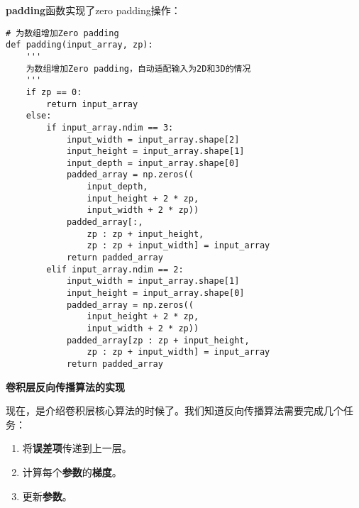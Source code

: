 \textbf{padding}函数实现了zero padding操作：
\begin{lstlisting}
# 为数组增加Zero padding
def padding(input_array, zp):
    '''
    为数组增加Zero padding，自动适配输入为2D和3D的情况
    '''
    if zp == 0:
        return input_array
    else:
        if input_array.ndim == 3:
            input_width = input_array.shape[2]
            input_height = input_array.shape[1]
            input_depth = input_array.shape[0]
            padded_array = np.zeros((
                input_depth, 
                input_height + 2 * zp,
                input_width + 2 * zp))
            padded_array[:,
                zp : zp + input_height,
                zp : zp + input_width] = input_array
            return padded_array
        elif input_array.ndim == 2:
            input_width = input_array.shape[1]
            input_height = input_array.shape[0]
            padded_array = np.zeros((
                input_height + 2 * zp,
                input_width + 2 * zp))
            padded_array[zp : zp + input_height,
                zp : zp + input_width] = input_array
            return padded_array
\end{lstlisting}

\textbf{卷积层反向传播算法的实现}

现在，是介绍卷积层核心算法的时候了。我们知道反向传播算法需要完成几个任务：
\begin{enumerate}
	\item
	      将\textbf{误差项}传递到上一层。
	\item
	      计算每个\textbf{参数}的\textbf{梯度}。
	\item
	      更新\textbf{参数}。
\end{enumerate}

